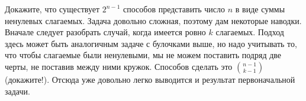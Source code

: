 \begin{exercise}
Докажите, что существует $2^{n-1}$ способов представить число $n$ в виде суммы ненулевых слагаемых. Задача довольно сложная, поэтому дам некоторые наводки. Вначале следует разобрать случай, когда имеется ровно $k$ слагаемых. Подход здесь может быть аналогичным задаче с булочками выше, но надо учитывать то, что чтобы слагаемые были ненулевыми, мы не можем поставить подряд две черты, не поставив между ними кружок. Способов сделать это $n-1\choose k -1$ (докажите!). Отсюда уже довольно легко выводится и результат первоначальной задачи.
\end{exercise}

